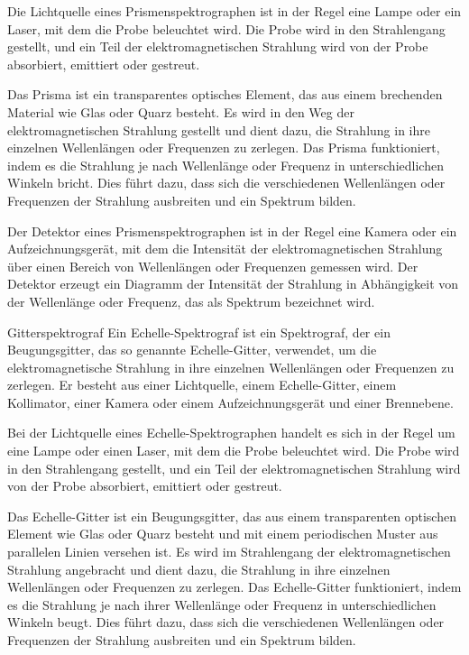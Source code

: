 \documentclass[12pt,english,ngerman]{scrartcl}
\begin{document}
Die Lichtquelle eines Prismenspektrographen ist in der Regel eine Lampe oder ein Laser, mit dem die Probe beleuchtet wird. Die Probe wird in den Strahlengang gestellt, und ein Teil der elektromagnetischen Strahlung wird von der Probe absorbiert, emittiert oder gestreut.

Das Prisma ist ein transparentes optisches Element, das aus einem brechenden Material wie Glas oder Quarz besteht. Es wird in den Weg der elektromagnetischen Strahlung gestellt und dient dazu, die Strahlung in ihre einzelnen Wellenlängen oder Frequenzen zu zerlegen. Das Prisma funktioniert, indem es die Strahlung je nach Wellenlänge oder Frequenz in unterschiedlichen Winkeln bricht. Dies führt dazu, dass sich die verschiedenen Wellenlängen oder Frequenzen der Strahlung ausbreiten und ein Spektrum bilden.

Der Detektor eines Prismenspektrographen ist in der Regel eine Kamera oder ein Aufzeichnungsgerät, mit dem die Intensität der elektromagnetischen Strahlung über einen Bereich von Wellenlängen oder Frequenzen gemessen wird. Der Detektor erzeugt ein Diagramm der Intensität der Strahlung in Abhängigkeit von der Wellenlänge oder Frequenz, das als Spektrum bezeichnet wird.

Gitterspektrograf
Ein Echelle-Spektrograf ist ein Spektrograf, der ein Beugungsgitter, das so genannte Echelle-Gitter, verwendet, um die elektromagnetische Strahlung in ihre einzelnen Wellenlängen oder Frequenzen zu zerlegen. Er besteht aus einer Lichtquelle, einem Echelle-Gitter, einem Kollimator, einer Kamera oder einem Aufzeichnungsgerät und einer Brennebene.

Bei der Lichtquelle eines Echelle-Spektrographen handelt es sich in der Regel um eine Lampe oder einen Laser, mit dem die Probe beleuchtet wird. Die Probe wird in den Strahlengang gestellt, und ein Teil der elektromagnetischen Strahlung wird von der Probe absorbiert, emittiert oder gestreut.

Das Echelle-Gitter ist ein Beugungsgitter, das aus einem transparenten optischen Element wie Glas oder Quarz besteht und mit einem periodischen Muster aus parallelen Linien versehen ist. Es wird im Strahlengang der elektromagnetischen Strahlung angebracht und dient dazu, die Strahlung in ihre einzelnen Wellenlängen oder Frequenzen zu zerlegen. Das Echelle-Gitter funktioniert, indem es die Strahlung je nach ihrer Wellenlänge oder Frequenz in unterschiedlichen Winkeln beugt. Dies führt dazu, dass sich die verschiedenen Wellenlängen oder Frequenzen der Strahlung ausbreiten und ein Spektrum bilden.
\end{document}

